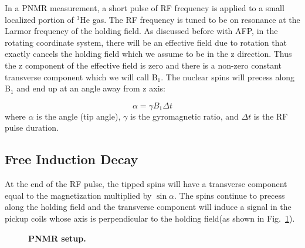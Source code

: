 In a PNMR measurement, a short pulse of RF frequency is applied to a small localized portion of $^{3}$He gas. The RF frequency is tuned to be on resonance at the Larmor frequency of the holding field. As discussed before with AFP, in the rotating coordinate system, there will be an effective field due to rotation that exactly cancels the holding field which we assume to be in the z direction. Thus the z component of the effective field is zero and there is a non-zero constant transverse component which we will call B$_{1}$. The nuclear spins will precess along B$_{1}$ and end up at an angle away from z axis: 

\begin{equation}
\alpha = \gamma B_{1} \Delta t
\end{equation}
where $\alpha$ is the angle (tip angle), $\gamma$ is the gyromagnetic ratio, and $\Delta t$ is the RF pulse duration. 

\subsection{Free Induction Decay}

At the end of the RF pulse, the tipped spins will have a transverse component equal to the magnetization multiplied by $\sin{\alpha}$. The spins continue to precess along the holding field and the transverse component will induce a signal in the pickup coils whose axis is perpendicular to the holding field(as shown in Fig.~\ref{PNMR_setup}).  

\begin{figure}[t!]
	\centering
	\caption{{\bf PNMR setup.}}
	\label{PNMR_setup}
\end{figure}

